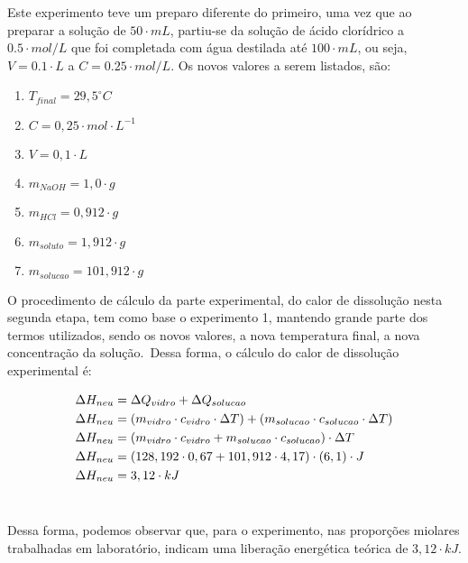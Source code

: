         	\indent Este experimento teve um preparo diferente do primeiro, uma vez que ao preparar a solução de $50\cdot mL$, partiu-se da solução de ácido clorídrico a $0.5\cdot mol / L$ que foi completada com água destilada até $100\cdot mL$, ou seja, $V = 0.1\cdot L$ a $C = 0.25 \cdot mol / L$. Os novos valores a serem listados, são:\
        	
        	\begin{enumerate}
        		\item $T_{final} = 29,5 ^{\circ}C$
        		\item $C = 0,25 \cdot mol \cdot L^{-1}$
        		\item $V = 0,1 \cdot L$
        		\item $m_{NaOH} = 1,0 \cdot g$
        		\item $m_{HCl} = 0,912 \cdot g$
        		\item $m_{soluto} = 1,912 \cdot g$
        		\item $m_{solucao} = 101,912 \cdot g$
        	\end{enumerate}
        	
        	\indent O procedimento de cálculo da parte experimental, do calor de dissolução nesta segunda etapa, tem como base o experimento 1, mantendo grande parte dos termos utilizados, sendo os novos valores, a nova temperatura final, a nova concentração da solução.\ Dessa forma, o cálculo do calor de dissolução experimental é:\
        	
        	\begin{equation}
        		\begin{split}
        			\notag
        			\Delta{H_{neu}} &= \Delta Q_{vidro} + \Delta Q_{solucao} \\
        			\Delta{H_{neu}} &= (m_{vidro} \cdot c_{vidro} \cdot \Delta T) + (m_{solucao} \cdot c_{solucao} \cdot \Delta T) \\
        			\Delta{H_{neu}} &= (m_{vidro} \cdot c_{vidro} + m_{solucao} \cdot c_{solucao}) \cdot \Delta T \\
        			\Delta{H_{neu}} &= (128,192 \cdot 0,67 + 101,912 \cdot 4,17) \cdot (6,1) \cdot J \\
        			\Delta{H_{neu}} &= 3,12 \cdot kJ
        		\end{split}
        	\end{equation}\
        
        	\indent Dessa forma, podemos observar que, para o experimento, nas proporções miolares trabalhadas em laboratório, indicam uma liberação energética teórica de $3,12 \cdot kJ$.\\        
     
